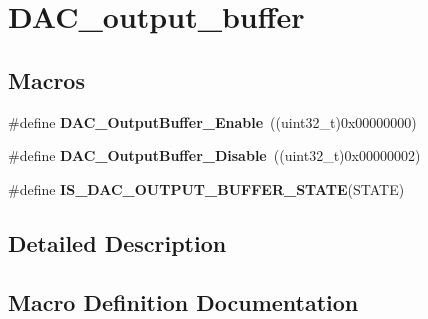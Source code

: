 \hypertarget{group___d_a_c__output__buffer}{}\section{D\+A\+C\+\_\+output\+\_\+buffer}
\label{group___d_a_c__output__buffer}
\subsection*{Macros}
\begin{DoxyCompactItemize}
\item 
\#define {\bfseries D\+A\+C\+\_\+\+Output\+Buffer\+\_\+\+Enable}~((uint32\+\_\+t)0x00000000)\hypertarget{group___d_a_c__output__buffer_gab3f92803a8b6bc5fb3e4859908b5161f}{}\label{group___d_a_c__output__buffer_gab3f92803a8b6bc5fb3e4859908b5161f}

\item 
\#define {\bfseries D\+A\+C\+\_\+\+Output\+Buffer\+\_\+\+Disable}~((uint32\+\_\+t)0x00000002)\hypertarget{group___d_a_c__output__buffer_gad41f919d7141398cfdedf8218ce64450}{}\label{group___d_a_c__output__buffer_gad41f919d7141398cfdedf8218ce64450}

\item 
\#define {\bfseries I\+S\+\_\+\+D\+A\+C\+\_\+\+O\+U\+T\+P\+U\+T\+\_\+\+B\+U\+F\+F\+E\+R\+\_\+\+S\+T\+A\+TE}(S\+T\+A\+TE)
\end{DoxyCompactItemize}


\subsection{Detailed Description}


\subsection{Macro Definition Documentation}
